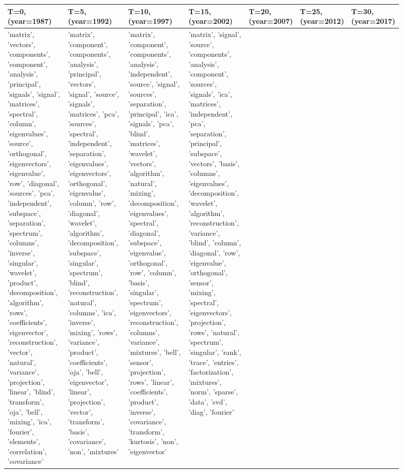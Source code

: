 \documentclass[a4paper]{report}
\begin{document}
\begin{figure}[t]
\begin{center}
\tiny
\begin{tabular}{|p{1.8cm}|p{1.8cm}|p{1.8cm}|p{1.8cm}|p{1.8cm}|p{1.8cm}|p{1.8cm}|}
\hline \bf T=0, (year=1987) & \bf T=5, (year=1992) & \bf T=10, (year=1997) & \bf T=15, (year=2002) & \bf T=20, (year=2007) & \bf T=25, (year=2012) & \bf T=30, (year=2017) \\ \hline

'matrix', 'vectors', 'components', 'component', 'analysis', 'principal', 'signals', 'signal', 'matrices', 'spectral', 'column', 'eigenvalues', 'source', 'orthogonal', 'eigenvectors', 'eigenvalue', 'row', 'diagonal', 'sources', 'pca', 'independent', 'subspace', 'separation', 'spectrum', 'columns', 'inverse', 'singular', 'wavelet', 'product', 'decomposition', 'algorithm', 'rows', 'coefficients', 'eigenvector', 'reconstruction', 'vector', 'natural', 'variance', 'projection', 'linear', 'blind', 'transform', 'oja', 'bell', 'mixing', 'ica', 'fourier', 'elements', 'correlation', 'covariance'
&
'matrix', 'component', 'components', 'analysis', 'principal', 'vectors', 'signal', 'source', 'signals', 'matrices', 'pca', 'sources', 'spectral', 'independent', 'separation', 'eigenvalues', 'eigenvectors', 'orthogonal', 'eigenvalue', 'column', 'row', 'diagonal', 'wavelet', 'algorithm', 'decomposition', 'subspace', 'singular', 'spectrum', 'blind', 'reconstruction', 'natural', 'columns', 'ica', 'inverse', 'mixing', 'rows', 'variance', 'product', 'coefficients', 'oja', 'bell', 'eigenvector', 'linear', 'projection', 'vector', 'transform', 'basis', 'covariance', 'non', 'mixtures'
&
'matrix', 'component', 'components', 'analysis', 'independent', 'source', 'signal', 'sources', 'separation', 'principal', 'ica', 'signals', 'pca', 'blind', 'matrices', 'wavelet', 'vectors', 'algorithm', 'natural', 'mixing', 'decomposition', 'eigenvalues', 'spectral', 'diagonal', 'subspace', 'eigenvalue', 'orthogonal', 'row', 'column', 'basis', 'singular', 'spectrum', 'eigenvectors', 'reconstruction', 'columns', 'variance', 'mixtures', 'bell', 'sensor', 'projection', 'rows', 'linear', 'coefficients', 'product', 'inverse', 'covariance', 'transform', 'kurtosis', 'non', 'eigenvector'
&
'matrix', 'signal', 'source', 'components', 'analysis', 'component', 'sources', 'signals', 'ica', 'matrices', 'independent', 'pca', 'separation', 'principal', 'subspace', 'vectors', 'basis', 'columns', 'eigenvalues', 'decomposition', 'wavelet', 'algorithm', 'reconstruction', 'variance', 'blind', 'column', 'diagonal', 'row', 'eigenvalue', 'orthogonal', 'sensor', 'mixing', 'spectral', 'eigenvectors', 'projection', 'rows', 'natural', 'spectrum', 'singular', 'rank', 'trace', 'entries', 'factorization', 'mixtures', 'norm', 'sparse', 'data', 'svd', 'diag', 'fourier'

\end{tabular}
\end{center}
\end{figure}
\end{document}
